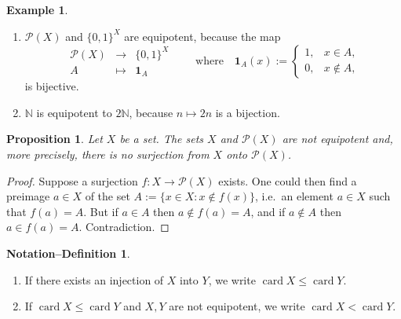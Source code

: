 \documentclass[11pt]{article}
\newtheorem{proposition}{Proposition}[section]
\theoremstyle{definition}
\newtheorem{notationdef}{Notation–Definition}[section]
\newtheorem{example}{Example}[section]
\begin{document}
\begin{example}
\begin{enumerate}[leftmargin=2em,label=\arabic*.]
\item $\mathcal P(X)$ and $\{0,1\}^{X}$ are equipotent, because the map
\[
\begin{array}{rcl}
\mathcal P(X) &\longrightarrow& \{0,1\}^{X} \\
A &\longmapsto& \mathbf 1_A
\end{array}
\qquad\text{where}\quad
\mathbf 1_A(x):=\begin{cases}
1,& x\in A,\\[2pt]
0,& x\notin A,
\end{cases}
\]
is bijective.
\item $\mathbb N$ is equipotent to $2\mathbb N$, because $n\mapsto 2n$ is a bijection.
\end{enumerate}
\end{example}


\begin{proposition}
Let $X$ be a set.
The sets $X$ and $\mathcal P(X)$ are not equipotent and, more precisely, there is no surjection from $X$ onto $\mathcal P(X)$.
\end{proposition}

\begin{proof}
Suppose a surjection $f:X\to\mathcal P(X)$ exists.
One could then find a preimage $a\in X$ of the set $A:=\{x\in X : x\notin f(x)\}$, i.e.\ an element $a\in X$ such that $f(a)=A$.
But if $a\in A$ then $a\notin f(a)=A$, and if $a\notin A$ then $a\in f(a)=A$.
Contradiction.
\end{proof}

\begin{notationdef}
\begin{enumerate}[label=(\alph*),leftmargin=2em]
\item If there exists an injection of $X$ into $Y$, we write $\operatorname{card} X \le \operatorname{card} Y$.
\item If $\operatorname{card} X \le \operatorname{card} Y$ and $X,Y$ are not equipotent, we write $\operatorname{card} X < \operatorname{card} Y$.
\end{enumerate}
\end{notationdef}
\end{document}
